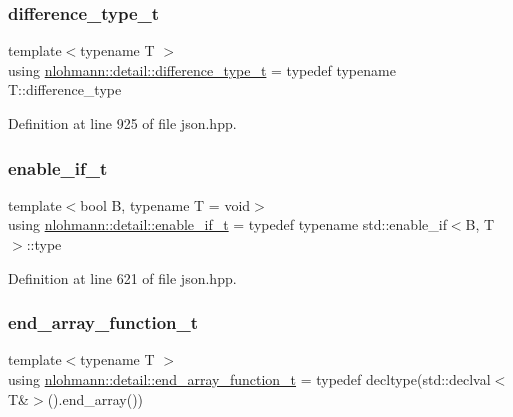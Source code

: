 \subsubsection{\texorpdfstring{difference\_type\_t}{difference\_type\_t}}
{\footnotesize\ttfamily template$<$typename T $>$ \\
using \mbox{\hyperlink{namespacenlohmann_1_1detail_a3603b59a17d1c5e15050743b847992f2}{nlohmann\+::detail\+::difference\+\_\+type\+\_\+t}} = typedef typename T\+::difference\+\_\+type}



Definition at line 925 of file json.\+hpp.

\mbox{\label{namespacenlohmann_1_1detail_a02bcbc878bee413f25b985ada771aa9c}} 
\subsubsection{\texorpdfstring{enable\_if\_t}{enable\_if\_t}}
{\footnotesize\ttfamily template$<$bool B, typename T  = void$>$ \\
using \mbox{\hyperlink{namespacenlohmann_1_1detail_a02bcbc878bee413f25b985ada771aa9c}{nlohmann\+::detail\+::enable\+\_\+if\+\_\+t}} = typedef typename std\+::enable\+\_\+if$<$B, T$>$\+::type}



Definition at line 621 of file json.\+hpp.

\mbox{\label{namespacenlohmann_1_1detail_aec53c029383b34a72182210e58fadb79}} 
\subsubsection{\texorpdfstring{end\_array\_function\_t}{end\_array\_function\_t}}
{\footnotesize\ttfamily template$<$typename T $>$ \\
using \mbox{\hyperlink{namespacenlohmann_1_1detail_aec53c029383b34a72182210e58fadb79}{nlohmann\+::detail\+::end\+\_\+array\+\_\+function\+\_\+t}} = typedef decltype(std\+::declval$<$T\&$>$().end\+\_\+array())}



